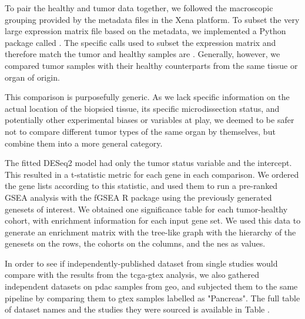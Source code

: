 To pair the healthy and tumor data together, we followed the macroscopic
grouping provided by the metadata files in the Xena platform. To subset the very
large expression matrix file based on the metadata, we implemented a Python
package called . The specific calls used to subset the
expression matrix and therefore match the tumor and healthy samples are
. Generally, however, we compared tumor samples with
their healthy counterparts from the same tissue or organ of origin.

This comparison is purposefully generic. As we lack specific information on the
actual location of the biopsied tissue, its specific microdissection status, and
potentially other experimental biases or variables at play, we deemed to be
safer not to compare different tumor types of the same organ by themselves, but
combine them into a more general category.


The fitted DESeq2 model had only the tumor status variable and the intercept.
This resulted in a t-statistic metric for each gene in each comparison. We
ordered the gene lists according to this statistic, and used them to run a
pre-ranked GSEA analysis with the fGSEA R package
\cite{korotkevichFastGeneSet2021} using the previously generated genesets of
interest.
We obtained one significance table for each tumor-healthy cohort, with
enrichment information for each input gene set. We used this data to generate an
enrichment matrix with the tree-like graph with the hierarchy of the genesets on
the rows, the cohorts on the columns, and the \gls{nes} as values.

In order to see if independently-published dataset from single studies would
compare with the results from the \gls{tcga}-\gls{gtex} analysis, we also
gathered  independent datasets on \gls{pdac} samples from
\gls{geo}, and subjected them to the same pipeline by comparing them to
\gls{gtex} samples labelled as "Pancreas". The full table of dataset names and
the studies they were sourced is available in Table .
